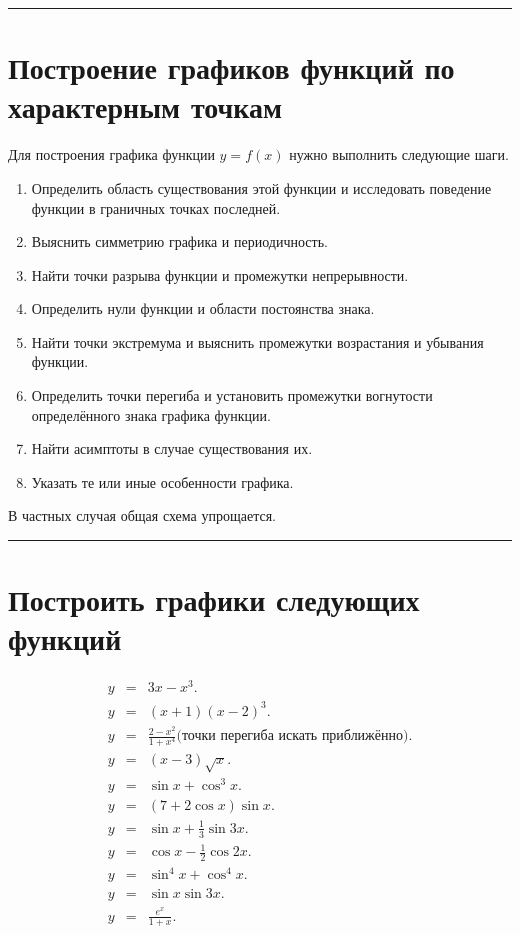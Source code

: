 \documentclass[10pt,a4paper]{scrartcl}
\newcommand{\HRule}{\rule{\linewidth}{0.1mm}}
\begin{document}
\HRule

\section{Построение графиков функций по характерным точкам}

Для построения графика функции $y = f(x)$ нужно выполнить следующие шаги.
\begin{enumerate}
  \item {Определить область существования этой функции и исследовать поведение функции в граничных точках последней.}
  \item {Выяснить симметрию графика и периодичность.}
  \item {Найти точки разрыва функции и промежутки непрерывности.}
  \item {Определить нули функции и области постоянства знака.}
  \item {Найти точки экстремума и выяснить промежутки возрастания и убывания функции.}
  \item {Определить точки перегиба и установить промежутки вогнутости определённого знака графика функции.}
  \item {Найти асимптоты в случае существования их.}
  \item {Указать те или иные особенности графика.}
\end{enumerate}

В частных случая общая схема упрощается.

\HRule

\section{Построить графики следующих функций}

\begin{eqnarray}
  y & = & 3x - x^3. \\
  y & = & (x + 1)(x - 2)^3. \\
  y & = & \frac{2 - x^2}{1 + x^4} \text{(точки перегиба искать приближённо)}. \\
  y & = & (x - 3) \sqrt{x}. \\
  y & = & \sin{x} + \cos^3{x}. \\
  y & = & (7 + 2 \cos{x})\sin{x}. \\
  y & = & \sin{x} + \frac{1}{3}\sin{3 x}. \\
  y & = & \cos{x} - \frac{1}{2}\cos{2 x}. \\
  y & = & \sin^4{x} + \cos^4{x}. \\
  y & = & \sin{x} \sin{3 x}. \\
  y & = & \frac{e^x}{1 + x}.
\end{eqnarray}
\end{document}
